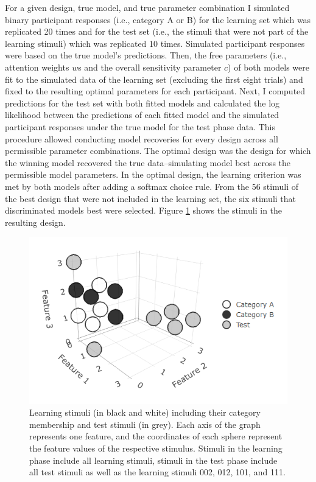 \documentclass[a4paper,man,natbib]{apa6}
\begin{document}
For a given design, true model, and true parameter combination I simulated binary participant responses (i.e., category A or B) for the learning set which was replicated 20 times and for the test set (i.e., the stimuli that were not part of the learning stimuli) which was replicated 10 times. Simulated participant responses were based on the true model's predictions. Then, the free parameters (i.e., attention weights $w$s and the overall sensitivity parameter $c$) of both models were fit to the simulated data of the learning set (excluding the first eight trials) and fixed to the resulting optimal parameters for each participant. Next, I computed predictions for the test set with both fitted models and calculated the log likelihood between the predictions of each fitted model and the simulated participant responses under the true model for the test phase data. This procedure allowed conducting model recoveries for every design across all permissible parameter combinations. The optimal design was the design for which the winning model recovered the true data--simulating model best across the permissible model parameters. In the optimal design, the learning criterion was met by both models after adding a softmax choice rule. From the 56 stimuli of the best design that were not included in the learning set, the six stimuli that discriminated models best were selected. Figure \ref{fig:environment} shows the stimuli in the resulting design.

\begin{figure}
\centering
\includegraphics[width = \textwidth]{fig_environment.png}
\caption{Learning stimuli (in black and white) including their category membership and test stimuli (in grey). Each axis of the graph represents one feature, and the coordinates of each sphere represent the feature values of the respective stimulus. Stimuli in the learning phase include all learning stimuli, stimuli in the test phase include all test stimuli as well as the learning stimuli 002, 012, 101, and 111.}
\label{fig:environment}
\end{figure}
\end{document}
